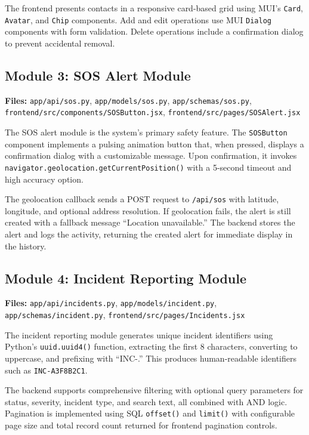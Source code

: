 The frontend presents contacts in a responsive card-based grid using MUI's \texttt{Card}, \texttt{Avatar}, and \texttt{Chip} components. Add and edit operations use MUI \texttt{Dialog} components with form validation. Delete operations include a confirmation dialog to prevent accidental removal.

\subsection{Module 3: SOS Alert Module}

\textbf{Files:} \texttt{app/api/sos.py}, \texttt{app/models/sos.py}, \texttt{app/schemas/sos.py}, \texttt{frontend/src/components/SOSButton.jsx}, \texttt{frontend/src/pages/SOSAlert.jsx}

The SOS alert module is the system's primary safety feature. The \texttt{SOSButton} component implements a pulsing animation button that, when pressed, displays a confirmation dialog with a customizable message. Upon confirmation, it invokes \texttt{navigator.geolocation.getCurrentPosition()} with a 5-second timeout and high accuracy option.

The geolocation callback sends a POST request to \texttt{/api/sos} with latitude, longitude, and optional address resolution. If geolocation fails, the alert is still created with a fallback message ``Location unavailable.'' The backend stores the alert and logs the activity, returning the created alert for immediate display in the history.

\subsection{Module 4: Incident Reporting Module}

\textbf{Files:} \texttt{app/api/incidents.py}, \texttt{app/models/incident.py}, \texttt{app/schemas/incident.py}, \texttt{frontend/src/pages/Incidents.jsx}

The incident reporting module generates unique incident identifiers using Python's \texttt{uuid.uuid4()} function, extracting the first 8 characters, converting to uppercase, and prefixing with ``INC-.'' This produces human-readable identifiers such as \texttt{INC-A3F8B2C1}.

The backend supports comprehensive filtering with optional query parameters for status, severity, incident type, and search text, all combined with AND logic. Pagination is implemented using SQL \texttt{offset()} and \texttt{limit()} with configurable page size and total record count returned for frontend pagination controls.

